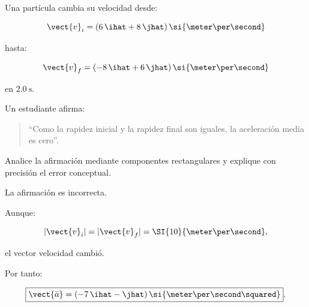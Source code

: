 \begin{ejercicio}
Una partícula cambia su velocidad desde:

\[
\vect{v}_i
=
(6\,\ihat+8\,\jhat)\,
\si{\meter\per\second}
\]

hasta:

\[
\vect{v}_f
=
(-8\,\ihat+6\,\jhat)\,
\si{\meter\per\second}
\]

en \(\SI{2.0}{\second}\).

Un estudiante afirma:

\begin{quote}
``Como la rapidez inicial y la rapidez final son iguales, la aceleración media es cero''.
\end{quote}

Analice la afirmación mediante componentes rectangulares y explique con precisión el error conceptual.
\end{ejercicio}

\begin{respuesta}
La afirmación es incorrecta.

Aunque:

\[
|\vect{v}_i|
=
|\vect{v}_f|
=
\SI{10}{\meter\per\second},
\]

el vector velocidad cambió.

Por tanto:

\[
\boxed{
\vect{\bar{a}}
=
(-7\,\ihat-\jhat)\,
\si{\meter\per\second\squared}
}.
\]
\end{respuesta}

